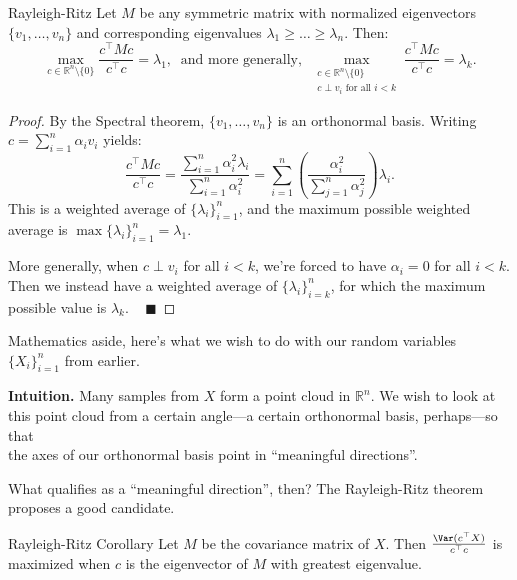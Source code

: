 \begin{theorem}{Rayleigh-Ritz}
    Let $M$ be any symmetric matrix with normalized eigenvectors $\{v_1, \dots, v_n\}$ and corresponding eigenvalues $\lambda_1 \geq \dots \geq \lambda_n$.  Then:
    \[ \max_{c \in \mathbb{R}^n \setminus \{0\}} \dfrac{c^{\top}Mc}{c^{\top}c} = \lambda_1, ~ \text{ and more generally, } ~ \max_{\substack{c \in \mathbb{R}^n \setminus \{0\} \\ c \perp v_i \text{ for all } i < k}} \dfrac{c^{\top}Mc}{c^{\top}c} = \lambda_k. \] \vspace{-0.5cm}
\end{theorem}

\begin{proof}
    By the Spectral theorem, $\{v_1, \dots, v_n\}$ is an orthonormal basis.  Writing $c = \sum_{i = 1}^n \alpha_i v_i$ yields:
    \[ \dfrac{c^{\top}Mc}{c^{\top}c} = \dfrac{\sum_{i = 1}^n \alpha_i^2 \lambda_i}{\sum_{i = 1}^n \alpha_i^2} = \sum_{i = 1}^n \left(\dfrac{\alpha_i^2}{\sum_{j = 1}^n \alpha_j^2}\right) \lambda_i. \]
    This is a weighted average of $\{\lambda_i\}_{i = 1}^n$, and the maximum possible weighted average is $\max\{\lambda_i\}_{ i = 1}^n = \lambda_1$.
    
    More generally, when $c \perp v_i$ for all $i < k$, we're forced to have $\alpha_i = 0$ for all $i < k$.  Then we instead have a weighted average of $\{\lambda_i\}_{i = k}^n$, for which the maximum possible value is $\lambda_k$. ~ $\blacksquare$
\end{proof}

Mathematics aside, here's what we wish to do with our random variables $\{X_i\}_{i = 1}^n$ from earlier.

\begin{center}
    \textbf{Intuition.} Many samples from $X$ form a point cloud in $\mathbb{R}^n$. We wish to look at \\ this point cloud from a certain angle---a certain orthonormal basis, perhaps---so that \\ the axes of our orthonormal basis point in ``meaningful directions''.
\end{center}

What qualifies as a ``meaningful direction'', then?  The Rayleigh-Ritz theorem proposes a good candidate.

\begin{theorem}{Rayleigh-Ritz Corollary}
    Let $M$ be the covariance matrix of $X$.  Then $\frac{\Var(c^{\top}X)}{c^{\top}c}$ is maximized when $c$ is the eigenvector of $M$ with greatest eigenvalue.
\end{theorem}

